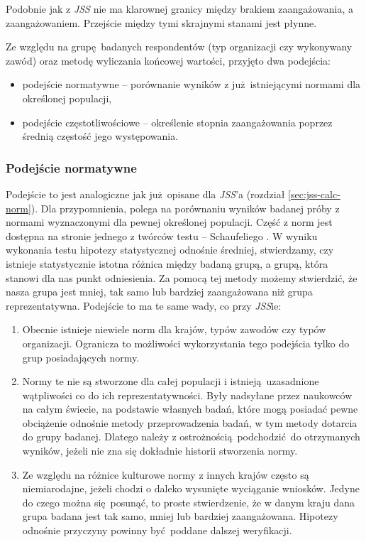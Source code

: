 Podobnie jak z \emph{JSS} nie ma klarownej granicy między brakiem zaangażowania, a zaangażowaniem. Przejście między tymi skrajnymi stanami jest płynne. 

Ze względu na grupę badanych respondentów (typ organizacji czy wykonywany zawód) oraz metodę wyliczania końcowej wartości, przyjęto dwa podejścia:
\begin{itemize}
\item podejście normatywne -- porównanie wyników z już istniejącymi normami dla określonej populacji,
\item podejście częstotliwościowe -- określenie stopnia zaangażowania poprzez średnią częstość jego występowania.
\end{itemize}
\subsubsection{Podejście normatywne}
Podejście to jest analogiczne jak już opisane dla \emph{JSS}'a (rozdział \ref{sec:jss-calc-norm}). Dla przypomnienia, polega na porównaniu wyników badanej próby z normami wyznaczonymi dla pewnej określonej populacji. Część z norm jest dostępna na stronie jednego z twórców testu -- Schaufeliego \citep{web:uwes-norms}. W wyniku wykonania testu hipotezy statystycznej odnośnie średniej, stwierdzamy, czy istnieje statystycznie istotna różnica między badaną grupą, a grupą, która stanowi
dla nas punkt odniesienia. Za pomocą tej metody możemy stwierdzić, że nasza grupa jest mniej, tak samo lub bardziej zaangażowana niż grupa reprezentatywna. Podejście to ma te same wady, co przy \emph{JSS}ie:
\begin{enumerate}
\item Obecnie istnieje niewiele norm dla krajów, typów zawodów czy typów organizacji. Ogranicza to możliwości wykorzystania tego podejścia tylko do grup posiadających normy.
\item Normy te nie są stworzone dla całej populacji i istnieją uzasadnione wątpliwości co do ich reprezentatywności. Były nadsyłane przez naukowców na całym świecie, na podstawie własnych badań, które mogą posiadać pewne obciążenie odnośnie metody przeprowadzenia badań, w tym metody dotarcia do grupy badanej. Dlatego należy z ostrożnością podchodzić do otrzymanych wyników, jeżeli nie zna się dokładnie historii stworzenia normy.
\item Ze względu na różnice kulturowe normy z innych krajów często są niemiarodajne, jeżeli chodzi o daleko wysunięte wyciąganie wniosków. Jedyne do czego można się posunąć, to proste stwierdzenie, że w danym kraju dana grupa badana jest tak samo, mniej lub bardziej zaangażowana. Hipotezy odnośnie przyczyny powinny być poddane dalszej weryfikacji.
\end{enumerate}

